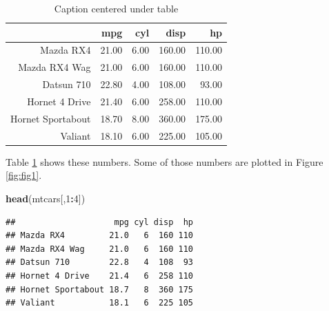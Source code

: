 \documentclass[useAMS,usenatbib,referee]{biom}
\newenvironment{Shaded}{\begin{snugshade}}{\end{snugshade}}
\newcommand{\KeywordTok}[1]{\textcolor[rgb]{0.13,0.29,0.53}{\textbf{#1}}}
\newcommand{\DecValTok}[1]{\textcolor[rgb]{0.00,0.00,0.81}{#1}}
\newcommand{\OperatorTok}[1]{\textcolor[rgb]{0.81,0.36,0.00}{\textbf{#1}}}
\newcommand{\NormalTok}[1]{#1}
\begin{document}
\begin{table}[ht]
\centering
\caption{Caption centered under table} 
\label{tab1}
\begin{tabular}{rrrrr}
  \hline
 & mpg & cyl & disp & hp \\ 
  \hline
Mazda RX4 & 21.00 & 6.00 & 160.00 & 110.00 \\ 
  Mazda RX4 Wag & 21.00 & 6.00 & 160.00 & 110.00 \\ 
  Datsun 710 & 22.80 & 4.00 & 108.00 & 93.00 \\ 
  Hornet 4 Drive & 21.40 & 6.00 & 258.00 & 110.00 \\ 
  Hornet Sportabout & 18.70 & 8.00 & 360.00 & 175.00 \\ 
  Valiant & 18.10 & 6.00 & 225.00 & 105.00 \\ 
   \hline
\end{tabular}
\end{table}

Table \ref{tab1} shows these numbers. Some of those numbers are plotted
in Figure \ref{fig:fig1}.

\begin{Shaded}
\begin{Highlighting}[]
\KeywordTok{head}\NormalTok{(mtcars[,}\DecValTok{1}\OperatorTok{:}\DecValTok{4}\NormalTok{])}
\end{Highlighting}
\end{Shaded}

\begin{verbatim}
##                    mpg cyl disp  hp
## Mazda RX4         21.0   6  160 110
## Mazda RX4 Wag     21.0   6  160 110
## Datsun 710        22.8   4  108  93
## Hornet 4 Drive    21.4   6  258 110
## Hornet Sportabout 18.7   8  360 175
## Valiant           18.1   6  225 105
\end{verbatim}






\label{lastpage}
\end{document}
